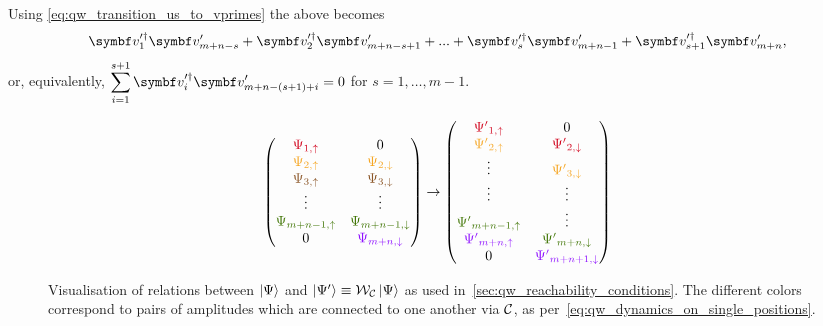 Using \cref{eq:qw_transition_us_to_vprimes} the above becomes
\begin{equation*}
	\bs v^{\prime\dagger}_1 \bs v^\prime_{m+n-s} +
	\bs v^{\prime\dagger}_2 \bs v^\prime_{m+n-s+1} +
	... +
    \bs v^{\prime\dagger}_{s} \bs v^\prime_{m+n-1} +
	\bs v^{\prime\dagger}_{s+1} \bs v^\prime_{m+n},
\end{equation*}
or, equivalently,
$\displaystyle \sum_{i=1}^{s+1} \bs v^{\prime\dagger}_i \bs v^\prime_{m+n-(s+1)+i}=0$
for $s=1,\dots,m-1$.

\begin{figure}[tbh]
    \centering
    \begin{equation*}
    \begin{pmatrix}
    \textcolor[rgb]{0.82,0.01,0.11}{\Psi _{1,\uparrow }} & 0\\
    \textcolor[rgb]{0.96,0.65,0.14}{\Psi _{2,\uparrow }} & \textcolor[rgb]{0.96,0.65,0.14}{\Psi }\textcolor[rgb]{0.96,0.65,0.14}{_{2,\downarrow }}\\
    \textcolor[rgb]{0.55,0.34,0.16}{\Psi _{3,\uparrow }} & \textcolor[rgb]{0.55,0.34,0.16}{\Psi }\textcolor[rgb]{0.55,0.34,0.16}{_{3,\downarrow }}\\
    \vdots  & \vdots \\
    \textcolor[rgb]{0.25,0.46,0.02}{\Psi _{m+n-1,\uparrow }} & \textcolor[rgb]{0.25,0.46,0.02}{\Psi }\textcolor[rgb]{0.25,0.46,0.02}{_{m+n-1,\downarrow }}\\
    0 & \textcolor[rgb]{0.56,0.07,1}{\Psi }\textcolor[rgb]{0.56,0.07,1}{_{m+n,\downarrow }}
    \end{pmatrix}\rightarrow \begin{pmatrix}
    \textcolor[rgb]{0.82,0.01,0.11}{\Psi '}\textcolor[rgb]{0.82,0.01,0.11}{_{1,\uparrow }} & 0\\
    \textcolor[rgb]{0.96,0.65,0.14}{\Psi '}\textcolor[rgb]{0.96,0.65,0.14}{_{2,\uparrow }} & \textcolor[rgb]{0.82,0.01,0.11}{\Psi '}\textcolor[rgb]{0.82,0.01,0.11}{_{2,\downarrow }}\\
    \vdots  & \textcolor[rgb]{0.96,0.65,0.14}{\Psi '}\textcolor[rgb]{0.96,0.65,0.14}{_{3,\downarrow }}\\
    \vdots  & \vdots \\
    \textcolor[rgb]{0.25,0.46,0.02}{\Psi '}\textcolor[rgb]{0.25,0.46,0.02}{_{m+n-1,\uparrow }} & \vdots \\
    \textcolor[rgb]{0.56,0.07,1}{\Psi '}\textcolor[rgb]{0.56,0.07,1}{_{m+n,\uparrow }} & \textcolor[rgb]{0.25,0.46,0.02}{\Psi '}\textcolor[rgb]{0.25,0.46,0.02}{_{m+n,\downarrow }}\\
    0 & \textcolor[rgb]{0.56,0.07,1}{\Psi '}\textcolor[rgb]{0.56,0.07,1}{_{m+n+1,\downarrow }}
    \end{pmatrix}
    \end{equation*}
    \caption{
        Visualisation of relations between $\ket\Psi$ and $\ket{\Psi'}\equiv{\mathcal{W}}_{\mathcal{C}}\ket\Psi$ as used in~\cref{sec:qw_reachability_conditions}. The different colors correspond to pairs of amplitudes which are connected to one another via ${\mathcal{C}}$, as per~\cref{eq:qw_dynamics_on_single_positions}.
    }
    \label{fig:qw_visualisation_PsiVsPsip}
\end{figure}

